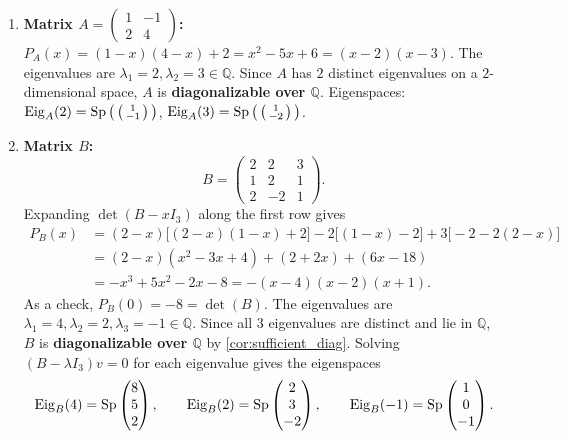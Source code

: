 \begin{exercisesolution*}
\label{sol:diagonalizability_over_Q}
\begin{enumerate}[label=\textbf{(\alph*)}]
    \item \textbf{Matrix $A = \left(\begin{smallmatrix} 1 & -1 \\ 2 & 4 \end{smallmatrix}\right)$:}
    $P_A(x) = (1-x)(4-x) + 2 = x^2 - 5x + 6 = (x-2)(x-3)$.
    The eigenvalues are $\lambda_1 = 2, \lambda_2 = 3 \in \mathbb{Q}$.
    Since $A$ has $2$ distinct eigenvalues on a $2$-dimensional space, $A$ is \textbf{diagonalizable over $\mathbb{Q}$}.
    Eigenspaces: $\operatorname{Eig}_A(2) = \operatorname{Sp}\big(\left(\begin{smallmatrix} 1 \\ -1 \end{smallmatrix}\right)\big)$, $\operatorname{Eig}_A(3) = \operatorname{Sp}\big(\left(\begin{smallmatrix} 1 \\ -2 \end{smallmatrix}\right)\big)$.

    \item \textbf{Matrix $B$:}
    \[
    B = \begin{pmatrix} 2 & 2 & 3 \\ 1 & 2 & 1 \\ 2 & -2 & 1 \end{pmatrix}.
    \]
    Expanding $\det(B - x I_3)$ along the first row gives
    \begin{align*}
    P_B(x) &= (2-x)\bigl[(2-x)(1-x) + 2\bigr] - 2\bigl[(1-x) - 2\bigr] + 3\bigl[-2 - 2(2-x)\bigr] \\
    &= (2-x)(x^2 - 3x + 4) + (2 + 2x) + (6x - 18) \\
    &= -x^3 + 5x^2 - 2x - 8 = -(x-4)(x-2)(x+1).
    \end{align*}
    As a check, $P_B(0) = -8 = \det(B)$.
    The eigenvalues are $\lambda_1 = 4, \lambda_2 = 2, \lambda_3 = -1 \in \mathbb{Q}$.
    Since all $3$ eigenvalues are distinct and lie in $\mathbb{Q}$, $B$ is \textbf{diagonalizable over $\mathbb{Q}$} by \cref{cor:sufficient_diag}.
    Solving $(B - \lambda I_3)v = 0$ for each eigenvalue gives the eigenspaces
    \[
    \operatorname{Eig}_B(4) = \operatorname{Sp} \begin{pmatrix} 8 \\ 5 \\ 2 \end{pmatrix}, \qquad
    \operatorname{Eig}_B(2) = \operatorname{Sp} \begin{pmatrix} 2 \\ 3 \\ -2 \end{pmatrix}, \qquad
    \operatorname{Eig}_B(-1) = \operatorname{Sp} \begin{pmatrix} 1 \\ 0 \\ -1 \end{pmatrix}.
    \]


\end{enumerate}
\end{exercisesolution*}
